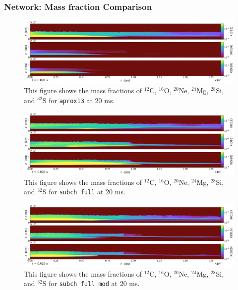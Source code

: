\documentclass[
	11pt, %
]{beamer}
\begin{document}
\begin{frame}[allowframebreaks]
\frametitle{Network: Mass fraction Comparison}
    \begin{figure}
        \centering
        \includegraphics[width=0.8\linewidth]{network_aprox13_nuc_frac.pdf}
        \caption{This figure shows the mass fractions of ${}^{12}$C, ${}^{16}$O, ${}^{20}$Ne,  ${}^{24}$Mg, ${}^{28}$Si, and ${}^{32}$S for {\tt aprox13} at 20 ms.}
    \end{figure}
    
    \begin{figure}
        \centering
        \includegraphics[width=0.8\linewidth]{network_subch_nuc_frac.pdf}
        \caption{This figure shows the mass fractions of ${}^{12}$C, ${}^{16}$O, ${}^{20}$Ne,  ${}^{24}$Mg, ${}^{28}$Si, and ${}^{32}$S for {\tt subch full} at 20 ms.}
    \end{figure}
    
    \begin{figure}
        \centering
        \includegraphics[width=0.8\linewidth]{network_subch_mod_nuc_frac.pdf}
        \caption{This figure shows the mass fractions of ${}^{12}$C, ${}^{16}$O, ${}^{20}$Ne, ${}^{24}$Mg, ${}^{28}$Si, and ${}^{32}$S for {\tt subch full mod} at 20 ms.}
    \end{figure}
    
\end{frame}


\end{document}
